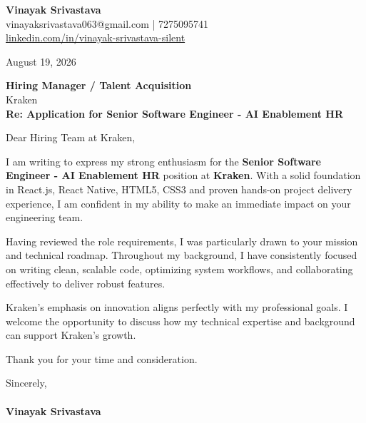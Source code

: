 \documentclass[11pt,a4paper]{article}
\begin{document}
\thispagestyle{empty}

{\Large \textbf{Vinayak Srivastava}}\\
vinayaksrivastava063@gmail.com | 7275095741 \\
\url{linkedin.com/in/vinayak-srivastava-silent}

\vspace{1em}
\hfill August 19, 2026

\textbf{Hiring Manager / Talent Acquisition}\\
Kraken\\

\vspace{1.5em}
\textbf{Re: Application for Senior Software Engineer - AI Enablement HR}

\vspace{1em}
Dear Hiring Team at Kraken,

I am writing to express my strong enthusiasm for the \textbf{Senior Software Engineer - AI Enablement HR} position at \textbf{Kraken}. With a solid foundation in React.js, React Native, HTML5, CSS3 and proven hands-on project delivery experience, I am confident in my ability to make an immediate impact on your engineering team.

Having reviewed the role requirements, I was particularly drawn to your mission and technical roadmap. Throughout my background, I have consistently focused on writing clean, scalable code, optimizing system workflows, and collaborating effectively to deliver robust features.

Kraken's emphasis on innovation aligns perfectly with my professional goals. I welcome the opportunity to discuss how my technical expertise and background can support Kraken's growth.

Thank you for your time and consideration.

\vspace{1.5em}
Sincerely,\\
\vspace{1em}\\
\textbf{Vinayak Srivastava}
\end{document}

